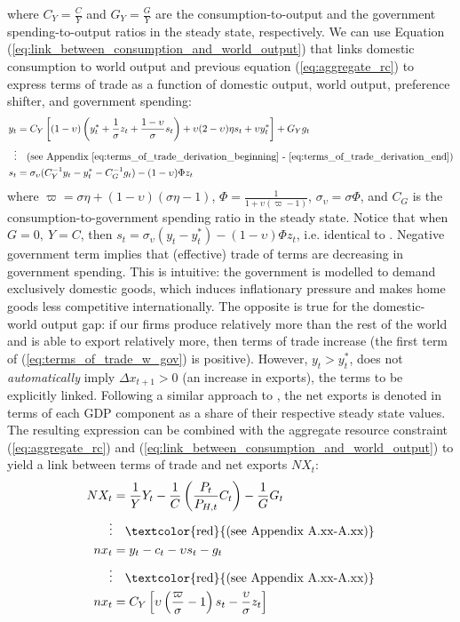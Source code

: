 where $C_Y=\frac{C}{Y}$ and $G_Y = \frac{G}{Y}$ are the consumption-to-output and the government spending-to-output ratios in the steady state, respectively. We can use Equation (\ref{eq:link_between_consumption_and_world_output}) that links domestic consumption to world output and previous equation (\ref{eq:aggregate_rc}) to express terms of trade as a function of domestic output, world output, preference shifter, and government spending:
\begin{align}
    y_t &= C_Y\left[(1-\upsilon)\left( y^*_t + \frac{1}{\sigma}z_t + \frac{1-\upsilon}{\sigma}s_t \right) + \upsilon (2-\upsilon)\eta s_t + \upsilon y^*_t\right] + G_Y g_t \\
    \vdots & \quad \text{(see Appendix \ref{eq:terms_of_trade_derivation_beginning} - \ref{eq:terms_of_trade_derivation_end})} \nonumber \\
    s_t &= \sigma_\upsilon(C_Y^{-1} y_t - y^*_t - C_G^{-1} g_t) - (1-\upsilon)\Phi z_t \label{eq:terms_of_trade_w_gov}
\end{align}
where $\varpi = \sigma \eta + (1-\upsilon)(\sigma \eta - 1)$, $\Phi = \frac{1}{1 + \upsilon (\varpi - 1)}$, $\sigma_\upsilon = \sigma \Phi$, and $C_G$ is the consumption-to-government spending ratio in the steady state. Notice that when $G=0,\ Y=C$, then $s_t = \sigma_\upsilon(y_t - y^*_t) - (1-\upsilon)\Phi z_t$, i.e. identical to \textcite{jordigal_2015_monetary}. Negative government term implies that (effective) trade of terms are decreasing in government spending. This is intuitive: the government is modelled to demand exclusively domestic goods, which induces inflationary pressure and makes home goods less competitive internationally. The opposite is true for the domestic-world output gap: if our firms produce relatively more than the rest of the world and is able to export relatively more, then terms of trade increase (the first term of (\ref{eq:terms_of_trade_w_gov}) is positive). However, $y_t > y^*_t$, does not \textit{automatically} imply $\Delta x_{t+1} > 0$ (an increase in exports), the terms to be explicitly linked. Following a similar approach to \citereset\textcite{jordigal_2015_monetary}, the net exports is denoted in terms of each GDP component as a share of their respective steady state values. The resulting expression can be combined with the aggregate resource constraint (\ref{eq:aggregate_rc}) and (\ref{eq:link_between_consumption_and_world_output}) to yield a link between terms of trade and net exports $NX_t$:
\begin{align}
    NX_t &= \frac{1}{Y} Y_t - \frac{1}{C}\left(\frac{P_t}{P_{H,t}}C_t\right) - \frac{1}{G}G_t \\
    \vdots & \quad \text{\textcolor{red}{(see Appendix A.xx-A.xx)}} \nonumber \\
    nx_t &= y_t - c_t - \upsilon s_t - g_t \label{eq:trade_balance_w_consumption} \\
    \vdots & \quad \text{\textcolor{red}{(see Appendix A.xx-A.xx)}} \nonumber \\
    nx_t&=C_Y\left[\upsilon \left(\frac{\varpi}{\sigma} - 1\right) s_t - \frac{\upsilon}{\sigma}z_t \right] \label{eq:trade_balance_wout_consumption}
\end{align}
